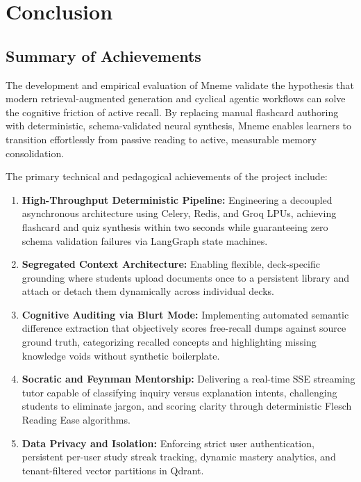 \documentclass[12pt,a4paper,oneside]{report}
\begin{document}
\chapter{Conclusion}

\section{Summary of Achievements}
The development and empirical evaluation of Mneme validate the hypothesis that modern retrieval-augmented generation and cyclical agentic workflows can solve the cognitive friction of active recall. By replacing manual flashcard authoring with deterministic, schema-validated neural synthesis, Mneme enables learners to transition effortlessly from passive reading to active, measurable memory consolidation.

The primary technical and pedagogical achievements of the project include:
\begin{enumerate}
    \item \textbf{High-Throughput Deterministic Pipeline:} Engineering a decoupled asynchronous architecture using Celery, Redis, and Groq LPUs, achieving flashcard and quiz synthesis within two seconds while guaranteeing zero schema validation failures via LangGraph state machines.
    \item \textbf{Segregated Context Architecture:} Enabling flexible, deck-specific grounding where students upload documents once to a persistent library and attach or detach them dynamically across individual decks.
    \item \textbf{Cognitive Auditing via Blurt Mode:} Implementing automated semantic difference extraction that objectively scores free-recall dumps against source ground truth, categorizing recalled concepts and highlighting missing knowledge voids without synthetic boilerplate.
    \item \textbf{Socratic and Feynman Mentorship:} Delivering a real-time SSE streaming tutor capable of classifying inquiry versus explanation intents, challenging students to eliminate jargon, and scoring clarity through deterministic Flesch Reading Ease algorithms.
    \item \textbf{Data Privacy and Isolation:} Enforcing strict user authentication, persistent per-user study streak tracking, dynamic mastery analytics, and tenant-filtered vector partitions in Qdrant.
\end{enumerate}
\end{document}
